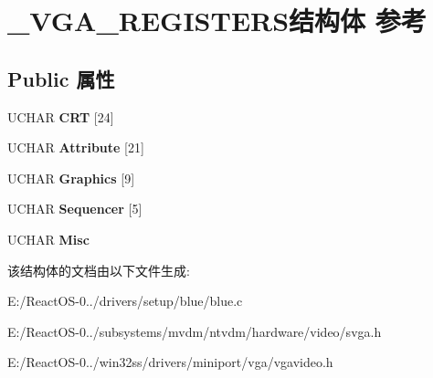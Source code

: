 \hypertarget{struct___v_g_a___r_e_g_i_s_t_e_r_s}{}\section{\+\_\+\+V\+G\+A\+\_\+\+R\+E\+G\+I\+S\+T\+E\+R\+S结构体 参考}
\label{struct___v_g_a___r_e_g_i_s_t_e_r_s}
\subsection*{Public 属性}
\begin{DoxyCompactItemize}
\item 
\mbox{\label{struct___v_g_a___r_e_g_i_s_t_e_r_s_a10f10e67ed75b5672a0626db2e7a5468}} 
U\+C\+H\+AR {\bfseries C\+RT} \mbox{[}24\mbox{]}
\item 
\mbox{\label{struct___v_g_a___r_e_g_i_s_t_e_r_s_a2986aa79c6b18ab232f2a3d53c50eb1c}} 
U\+C\+H\+AR {\bfseries Attribute} \mbox{[}21\mbox{]}
\item 
\mbox{\label{struct___v_g_a___r_e_g_i_s_t_e_r_s_aa9e1c835e44775359faf27a36ff8cea2}} 
U\+C\+H\+AR {\bfseries Graphics} \mbox{[}9\mbox{]}
\item 
\mbox{\label{struct___v_g_a___r_e_g_i_s_t_e_r_s_a914a1e403b848eb8f70a84727155dfa3}} 
U\+C\+H\+AR {\bfseries Sequencer} \mbox{[}5\mbox{]}
\item 
\mbox{\label{struct___v_g_a___r_e_g_i_s_t_e_r_s_aa0c4877ed38fbc71d669d08d64055bba}} 
U\+C\+H\+AR {\bfseries Misc}
\end{DoxyCompactItemize}


该结构体的文档由以下文件生成\+:\begin{DoxyCompactItemize}
\item 
E\+:/\+React\+O\+S-\/0../drivers/setup/blue/blue.\+c\item 
E\+:/\+React\+O\+S-\/0../subsystems/mvdm/ntvdm/hardware/video/svga.\+h\item 
E\+:/\+React\+O\+S-\/0../win32ss/drivers/miniport/vga/vgavideo.\+h\end{DoxyCompactItemize}
